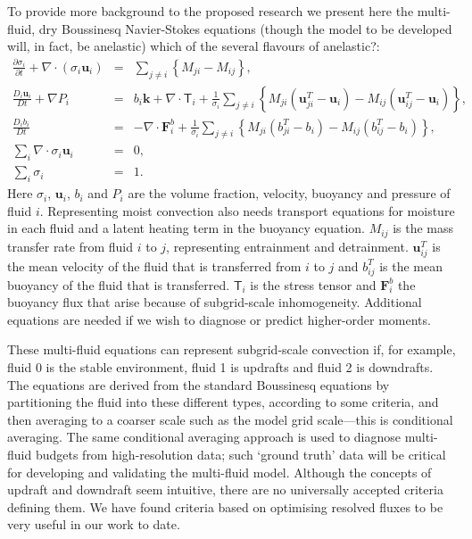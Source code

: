\documentclass[11pt,a4paper]{article}
\begin{document}
To provide more background to the proposed research we present here the
multi-fluid, dry Boussinesq Navier-Stokes equations \cite[approximated by][]{WMS20} (though the model to be developed will, in fact,
be anelastic) {\color{red} which of the several flavours of anelastic?}:
\begin{eqnarray}
\frac{\partial\sigma_{i}}{\partial t}+\nabla\cdot(\sigma_{i}\mathbf{u}_{i}) & = & {\textstyle\sum}_{j\ne i}\left\{ M_{ji}-M{}_{ij}\right\} ,\label{eq:sigma}\\
\frac{D_{i}\mathbf{u}_{i}}{Dt}+\nabla P_{i} & = & b_{i}\mathbf{k}+\nabla\cdot \mathsf{T}_i +\frac{1}{\sigma_{i}}{\textstyle\sum}_{j\ne i}\left\{ M_{ji}\left(\mathbf{u}_{ji}^{T}-\mathbf{u}_{i}\right)-M_{ij}\left(\mathbf{u}_{ij}^{T}-\mathbf{u}_{i}\right)\right\} , \label{eq:mom}\\
\frac{D_{i}b_{i}}{Dt} & = & -\nabla\cdot \mathbf{F}^b_{i} +\frac{1}{\sigma_{i}}{\textstyle\sum}_{j\ne i}\left\{ M_{ji}\left(b_{ji}^{T}-b_{i}\right)-M_{ij}\left(b_{ij}^{T}-b_{i}\right)\right\} , \label{eq:b}\\
{\textstyle\sum}_{i}\nabla\cdot\sigma_{i}\mathbf{u}_{i} & = & 0 , \label{eq:divFree}\\
{\textstyle\sum}_{i}\sigma_{i} & = & 1.\label{eq:sumOne}
\end{eqnarray}
Here $\sigma_i$, $\mathbf{u}_i$, $b_i$ and $P_i$ are the volume fraction, velocity, buoyancy and pressure of fluid $i$. Representing moist convection also needs transport equations for moisture in each fluid and a latent heating term in the buoyancy equation. $M_{ij}$ is the mass transfer rate from fluid $i$ to $j$, representing entrainment and detrainment. $\mathbf{u}_{ij}^T$ is the mean velocity of the fluid that is transferred from $i$ to $j$ and $b_{ij}^T$ is the mean buoyancy of the fluid that is transferred. 
$\mathsf{T}_i$ is the stress tensor and $\mathbf{F}^b_{i}$ the buoyancy flux that arise because of subgrid-scale inhomogeneity.
Additional equations are needed if we wish to diagnose or predict higher-order moments.

These multi-fluid equations can represent subgrid-scale convection if, for example, fluid 0 is the stable environment, fluid 1 is updrafts and fluid 2 is downdrafts. The equations are derived from the standard Boussinesq equations by partitioning the fluid into these different types, according to some criteria, and then averaging to a coarser scale such as the model grid scale---this is conditional averaging. The same conditional averaging approach is used to diagnose multi-fluid budgets from high-resolution data; such `ground truth' data will be critical for developing and validating the multi-fluid model.
Although the concepts of updraft and downdraft seem intuitive, there are no universally accepted criteria defining them. We have found criteria based on optimising resolved fluxes \cite[]{ETB20} to be very useful in our work to date.
\end{document}
